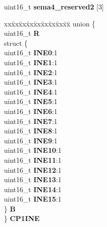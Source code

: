 \begin{DoxyCompactItemize}
\begin{tabbing}
\end{tabbing}\item 
\mbox{\label{structSEMA4__tag_a22b896b01cf07cd7b2e0af00136dad41}} 
uint16\+\_\+t {\bfseries sema4\+\_\+reserved2} \mbox{[}3\mbox{]}
\item 
\mbox{\label{structSEMA4__tag_aa0c270a79199b41965ed036bf43d2c5c}} 
\begin{tabbing}
xx\=xx\=xx\=xx\=xx\=xx\=xx\=xx\=xx\=\kill
union \{\\
\>uint16\_t {\bfseries R}\\
\>struct \{\\
\>\>uint16\_t {\bfseries INE0}:1\\
\>\>uint16\_t {\bfseries INE1}:1\\
\>\>uint16\_t {\bfseries INE2}:1\\
\>\>uint16\_t {\bfseries INE3}:1\\
\>\>uint16\_t {\bfseries INE4}:1\\
\>\>uint16\_t {\bfseries INE5}:1\\
\>\>uint16\_t {\bfseries INE6}:1\\
\>\>uint16\_t {\bfseries INE7}:1\\
\>\>uint16\_t {\bfseries INE8}:1\\
\>\>uint16\_t {\bfseries INE9}:1\\
\>\>uint16\_t {\bfseries INE10}:1\\
\>\>uint16\_t {\bfseries INE11}:1\\
\>\>uint16\_t {\bfseries INE12}:1\\
\>\>uint16\_t {\bfseries INE13}:1\\
\>\>uint16\_t {\bfseries INE14}:1\\
\>\>uint16\_t {\bfseries INE15}:1\\
\>\} {\bfseries B}\\
\} {\bfseries CP1INE}\\


\end{tabbing}
\end{DoxyCompactItemize}
